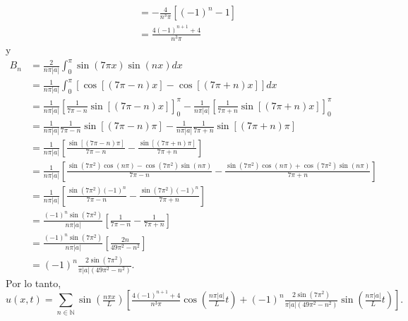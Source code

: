 \documentclass[12pt]{article}
\newcommand{\N}{\mathbb{N}}
\newcommand{\pp}[1]{\left( #1 \right)}
\newcommand{\cc}[1]{\left[ #1 \right]}
\begin{document}
\begin{enumerate}
\begin{enumerate}
\begin{align*}
                &= -\frac{4}{n^3\pi}\cc{(-1)^n-1}\\
                &= \frac{4(-1)^{n+1}+4}{n^3\pi}
            \end{align*}
            y
            \begin{align*}
                B_n &= \frac{2}{n\pi|a|}\int_0^{\pi}\sin(7\pi x)\sin\pp{n x}dx\\
                &= \frac{1}{n\pi|a|}\int_0^{\pi}\cc{\cos\cc{(7\pi-n)x}-\cos\cc{(7\pi+n)x}}dx\\
                &= \frac{1}{n\pi|a|}\cc{\frac{1}{7\pi-n}\sin\cc{(7\pi-n)x}}_0^\pi-\frac{1}{n\pi|a|}\cc{\frac{1}{7\pi+n}\sin\cc{(7\pi+n)x}}_0^\pi\\ 
                &= \frac{1}{n\pi|a|}\frac{1}{7\pi-n}\sin\cc{(7\pi-n)\pi}-\frac{1}{n\pi|a|}\frac{1}{7\pi+n}\sin\cc{(7\pi+n)\pi}\\ 
                &= \frac{1}{n\pi|a|}\cc{\frac{\sin\cc{(7\pi-n)\pi}}{7\pi-n}-\frac{\sin\cc{(7\pi+n)\pi}}{7\pi+n}}\\
                &= \frac{1}{n\pi|a|}\cc{\frac{\sin(7\pi^2)\cos(n\pi)-\cos(7\pi^2)\sin(n\pi)}{7\pi-n}
                   -\frac{\sin(7\pi^2)\cos(n\pi)+\cos(7\pi^2)\sin(n\pi)}{7\pi+n}}\\
                &= \frac{1}{n\pi|a|}\cc{\frac{\sin(7\pi^2)(-1)^n}{7\pi-n}
                   -\frac{\sin(7\pi^2)(-1)^n}{7\pi+n}}\\
                &= \frac{(-1)^n\sin(7\pi^2)}{n\pi|a|}\cc{\frac{1}{7\pi-n}-\frac{1}{7\pi+n}}\\
                &= \frac{(-1)^n\sin(7\pi^2)}{n\pi|a|}\cc{\frac{2n}{49\pi^2-n^2}}\\
                &= (-1)^n\frac{2\sin(7\pi^2)}{\pi|a|(49\pi^2-n^2)}.
            \end{align*}
            Por lo tanto,
            \[ u(x,t)=\sum_{n\in\N}\sin\pp{\tfrac{n\pi x}{L}}\cc{\tfrac{4(-1)^{n+1}+4}{n^3\pi}\cos\pp{\tfrac{n\pi |a|}{L}t}+ (-1)^n\tfrac{2\sin(7\pi^2)}{\pi|a|(49\pi^2-n^2)}\sin\pp{\tfrac{n\pi |a|}{L}t}}. \]


\end{enumerate}
\end{enumerate}
\end{document}
